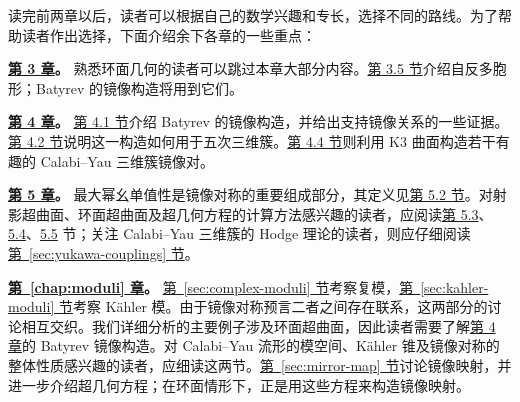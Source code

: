 读完前两章以后，读者可以根据自己的数学兴趣和专长，选择不同的路线。为了帮助读者作出选择，下面介绍余下各章的一些重点：

\noindent\textbf{\hyperref[chap:toric]{第 3 章}。} 熟悉环面几何的读者可以跳过本章大部分内容。\hyperref[sec:fano-reflexive]{第 3.5 节}介绍自反多胞形；Batyrev 的镜像构造将用到它们。

\noindent\textbf{\hyperref[chap:mirror-constructions]{第 4 章}。} \hyperref[sec:batyrev-mirror]{第 4.1 节}介绍 Batyrev 的镜像构造，并给出支持镜像关系的一些证据。\hyperref[sec:quintic-revisited]{第 4.2 节}说明这一构造如何用于五次三维簇。\hyperref[sec:voisin-borcea]{第 4.4 节}则利用 K3 曲面构造若干有趣的 Calabi--Yau 三维簇镜像对。

\noindent\textbf{\hyperref[chap:hodge-yukawa]{第 5 章}。} 最大幂幺单值性是镜像对称的重要组成部分，其定义见\hyperref[sec:maximal-unipotent]{第 5.2 节}。对射影超曲面、环面超曲面及超几何方程的计算方法感兴趣的读者，应阅读\hyperref[sec:griffiths-dwork]{第 5.3}、\hyperref[sec:hodge-examples]{5.4}、\hyperref[sec:hypergeometric]{5.5} 节；关注 Calabi--Yau 三维簇的 Hodge 理论的读者，则应仔细阅读\hyperref[sec:yukawa-couplings]{第~\ref*{sec:yukawa-couplings} 节}。

\noindent\textbf{\hyperref[chap:moduli]{第~\ref*{chap:moduli} 章}。} \hyperref[sec:complex-moduli]{第~\ref*{sec:complex-moduli} 节}考察复模，\hyperref[sec:kahler-moduli]{第~\ref*{sec:kahler-moduli} 节}考察 Kähler 模。由于镜像对称预言二者之间存在联系，这两部分的讨论相互交织。我们详细分析的主要例子涉及环面超曲面，因此读者需要了解\hyperref[chap:mirror-constructions]{第 4 章}的 Batyrev 镜像构造。对 Calabi--Yau 流形的模空间、Kähler 锥及镜像对称的整体性质感兴趣的读者，应细读这两节。\hyperref[sec:mirror-map]{第~\ref*{sec:mirror-map} 节}讨论镜像映射，并进一步介绍超几何方程；在环面情形下，正是用这些方程来构造镜像映射。

